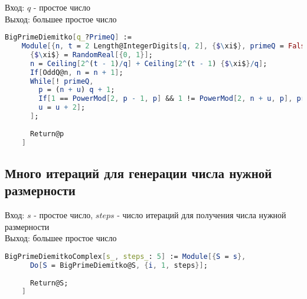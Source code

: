       Вход: {$q$} - простое число \\
      Выход: большее простое число

      \begin{lstlisting}[language=Mathematica,caption={
	Теорема Диемитко (1 итерация)
      }]
	BigPrimeDiemitko[q_?PrimeQ] := 
	Module[{n, t = 2 Length@IntegerDigits[q, 2], {$\xi$}, primeQ = False, u = 0, p},
	  {$\xi$} = RandomReal[{0, 1}];
	  n = Ceiling[2^(t - 1)/q] + Ceiling[2^(t - 1) {$\xi$}/q];
	  If[OddQ@n, n = n + 1];
	  While[! primeQ,
	    p = (n + u) q + 1;
	    If[1 == PowerMod[2, p - 1, p] && 1 != PowerMod[2, n + u, p], primeQ = True,
	    u = u + 2];
	  ];
	
	  Return@p
	]
      \end{lstlisting}

    \subsection{Много итераций для генерации числа нужной размерности}
    
      Вход: {$s$} - простое число, {$steps$} - число итераций для получения числа нужной размерности \\
      Выход: большее простое число

      \begin{lstlisting}[language=Mathematica,caption={
	  Теорема Диемитко (много итераций)
      }]
	BigPrimeDiemitkoComplex[s_, steps_: 5] := Module[{S = s},
	  Do[S = BigPrimeDiemitko@S, {i, 1, steps}];
  
	  Return@S;
	]
      \end{lstlisting}
